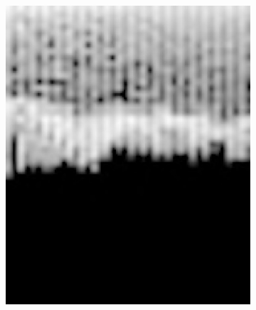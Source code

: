 \begin{figure}[h!]
	\begin{subfigure}{0.45\textwidth}
		\includegraphics[width=\linewidth]{Images/DataMining/SpectrogramNoFirst.jpg}
		\caption{}    %
		\label{subfig:SpectrogramNoFirst}
	\end{subfigure}
	\hfill
	\begin{subfigure}{0.45\textwidth}

\end{subfigure}
\end{figure}
